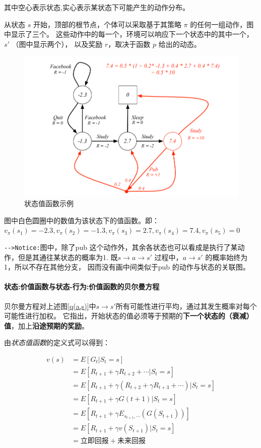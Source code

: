 \documentclass[UTF8,a4paper,12pt]{ctexbook}
\begin{document}
				其中空心表示状态,实心表示某状态下可能产生的动作分布。
				
				从状态 $s$ 开始，顶部的根节点，个体可以采取基于其策略 $\pi$ 的任何一组动作，图中显示了三个。 这些动作中的每一个，环境可以响应下一个状态中的其中一个，$s′$ （图中显示两个）， 以及奖励 $r$，取决于函数 $p$ 给出的动态。
				
				\begin{figure}[H] 
					\centering
					\includegraphics[width=.8\linewidth]{MDP-example3}
					\caption{状态值函数示例}
				\end{figure}		
								
				图中白色圆圈中的数值为该状态下的值函数。即：$v_\pi(s_1) = -2.3, v_\pi(s_2) = -1.3, v_\pi(s_3) = 2.7, v_\pi(s_4) = 7.4, v_\pi(s_5) = 0$			
				
				\verb|-->Notice:|图中，除了pub 这个动作外，其余各状态也可以看成是执行了某动作，但是其通往某状态的概率为1. 既$s \to a \to s'$ 过程中，$a \to s'$ 的概率始终为1，所以不存在其他分支， 因而没有画中间类似于pub 的动作与状态的关联图。	
			
			\paragraph{状态:价值函数与状态-行为:价值函数的贝尔曼方程}
				
				贝尔曼方程对上述图\ref{q(a,s)}中$s \to s'$所有可能性进行平均，通过其发生概率对每个可能性进行加权。 它指出，开始状态的值必须等于预期的\textbf{下一个状态的（衰减）值}，加上\textbf{沿途预期的奖励}。
			
				由\textit{状态值函数}的定义式可以得到：
				
				\begin{equation}
					\begin{aligned}
						v(s) &= E[G_t|S_t = s]	\\
							&= E[R_{t+1} + \gamma R_{t+2} + \cdots | S_t = s] \\
							&= E[R_{t+1} + \gamma (R_{t+2} + \gamma R_{t+3} + \cdots)|S_t = s]\\
							&= E[R_{t+1} + \gamma G(t+1)|S_t = s]	\\
							&= E[R_{t+1} + \gamma E_{s_{t+1},\cdots}(G(S_{t+1}))]	\\
							&= E[R_{t+1} + \gamma v(S_{t+1})|S_t = s]	\\
							&= \textit{立即回报} + \textit{未来回报}
					\end{aligned}
				\end{equation}
				
\end{document}
